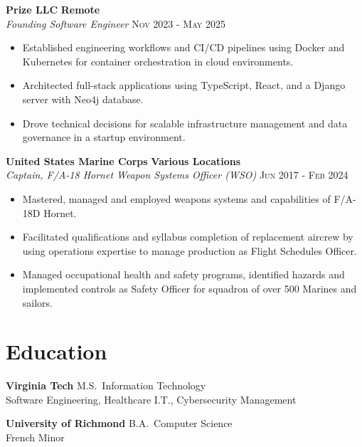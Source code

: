 \documentclass[10pt,letterpaper]{article}
\newcommand{\role}[4]{%
  \vspace{0.4em}
  \noindent\textbf{#1} \hfill \textbf{#2}\\
  \noindent\textit{#3} \hfill \textsc{#4}
}
\newcommand{\school}[3]{%
  \vspace{0.4em}
  \noindent\textbf{#1} \hfill #2\\
  #3
}
\begin{document}
\vspace{0.4em}

\role{Prize LLC}{Remote}{Founding Software Engineer}{Nov 2023 - May 2025}
\begin{itemize}
  \item Established engineering workflows and CI/CD pipelines using Docker and Kubernetes for container orchestration in cloud environments.
  \item Architected full-stack applications using TypeScript, React, and a Django server with Neo4j database.
  \item Drove technical decisions for scalable infrastructure management and data governance in a startup environment.
\end{itemize}

\vspace{0.4em}

\role{United States Marine Corps}{Various Locations}{Captain, F/A-18 Hornet Weapon Systems Officer (WSO)}{Jun 2017 - Feb 2024}
\begin{itemize}
  \item Mastered, managed and employed weapons systems and capabilities of F/A-18D Hornet.
  \item Facilitated qualifications and syllabus completion of replacement aircrew by using operations expertise to manage production as Flight Schedules Officer.
  \item Managed occupational health and safety programs, identified hazards and implemented controls as Safety Officer for squadron of over 500 Marines and sailors.
\end{itemize}

\vspace{0.4em}


\section{Education}

\vspace{0.4em}

\school{Virginia Tech}{M.S.\ Information Technology}{Software Engineering, Healthcare I.T., Cybersecurity Management}

\school{University of Richmond}{B.A.\ Computer Science}{French Minor}

\vspace{0.4em}
\end{document}
